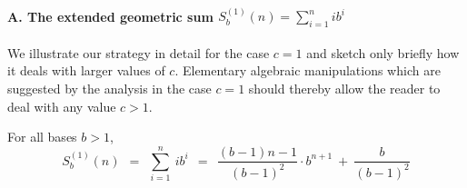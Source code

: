 \medskip

\paragraph{\small\sf A. The extended geometric sum $S^{(1)}_b(n) =
  \sum_{i=1}^n i b^i$}

We illustrate our strategy in detail for the case $c=1$ and sketch
only briefly how it deals with larger values of $c$.  Elementary
algebraic manipulations which are suggested by the analysis in the
case $c=1$ should thereby allow the reader to deal with any value $c >
1$.

\begin{prop}
\label{thm:sum-i2i}
For all bases $b > 1$,
\begin{equation}
\label{eq:sum-i2i}
S_b^{(1)}(n) \ \ = \ \
\sum_{i=1}^n \ i b^i
\ \ = \ \ 
\frac{(b-1)n -1}{(b-1)^2} \cdot  b^{n+1} \ + \ \frac{b}{(b-1)^2}
\end{equation}
\end{prop}


